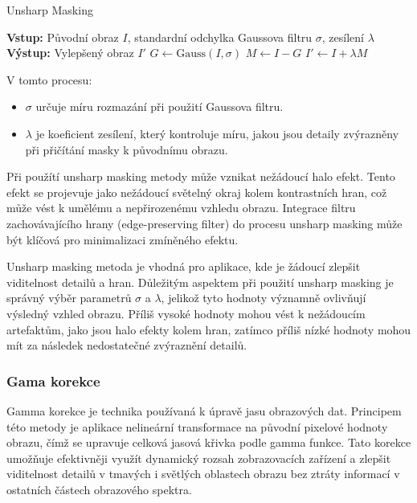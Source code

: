 \documentclass[male,czech,api_ing]{thesis}
\begin{document}
\begin{algorithm}
    \caption{Unsharp Masking}
    \begin{algorithmic}[1]
        \State \textbf{Vstup:} Původní obraz $I$, standardní odchylka Gaussova filtru $\sigma$, zesílení $\lambda$
        \State \textbf{Výstup:} Vylepšený obraz $I'$
        \State $G \gets \text{Gauss}(I, \sigma)$ 
        \State $M \gets I - G$ 
        \State $I' \gets I + \lambda M$ 
    \end{algorithmic}
\end{algorithm}

V tomto procesu:
\begin{itemize}
    \item $\sigma$ určuje míru rozmazání při použití Gaussova filtru.
    \item $\lambda$ je koeficient zesílení, který kontroluje míru, jakou jsou detaily zvýrazněny při přičítání masky k původnímu obrazu.
\end{itemize}

Při použítí unsharp masking metody může vznikat nežádoucí halo efekt. Tento efekt se projevuje jako nežádoucí světelný okraj kolem kontrastních hran, což může vést k umělému a nepřirozenému vzhledu obrazu. Integrace filtru zachovávajícího hrany (edge-preserving filter) do procesu unsharp masking může být klíčová pro minimalizaci zmíněného efektu. \cite{UnsharpMasking}

Unsharp masking metoda je vhodná pro aplikace, kde je žádoucí zlepšit viditelnost detailů a hran. Důležitým aspektem při použití unsharp masking je správný výběr parametrů $\sigma$ a $\lambda$, jelikož tyto hodnoty významně ovlivňují výsledný vzhled obrazu. Příliš vysoké hodnoty mohou vést k nežádoucím artefaktům, jako jsou halo efekty kolem hran, zatímco příliš nízké hodnoty mohou mít za následek nedostatečné zvýraznění detailů.

\subsubsection{Gama korekce}
Gamma korekce je technika používaná k úpravě jasu obrazových dat. Principem této metody je aplikace nelineární transformace na původní pixelové hodnoty obrazu, čímž se upravuje celková jasová křivka podle gamma funkce. Tato korekce umožňuje efektivněji využít dynamický rozsah zobrazovacích zařízení a zlepšit viditelnost detailů v tmavých i světlých oblastech obrazu bez ztráty informací v ostatních částech obrazového spektra. \cite{PreprocessingBook}
\end{document}
